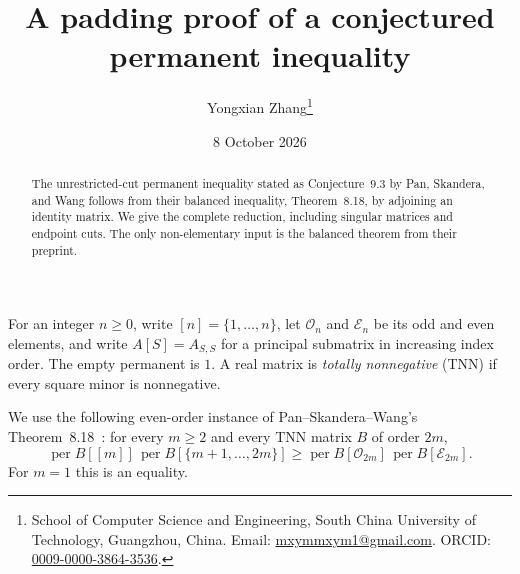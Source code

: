 \documentclass[11pt]{article}
\title{A padding proof of a conjectured permanent inequality}
\author{Yongxian Zhang\thanks{School of Computer Science and Engineering,
South China University of Technology, Guangzhou, China.
Email: \href{mailto:mxymmxym1@gmail.com}{mxymmxym1@gmail.com}.
ORCID: \href{https://orcid.org/0009-0000-3864-3536}{0009-0000-3864-3536}.}}
\date{8 October 2026}
\newcommand{\per}{\operatorname{per}}
\newcommand{\OO}{\mathcal O}
\newcommand{\EE}{\mathcal E}
\begin{document}
\maketitle
\begin{abstract}
The unrestricted-cut permanent inequality stated as Conjecture~9.3 by Pan, Skandera, and Wang follows from their balanced inequality, Theorem~8.18, by adjoining an identity matrix. We give the complete reduction, including singular matrices and endpoint cuts. The only non-elementary input is the balanced theorem from their preprint.
\end{abstract}
For an integer $n\geq 0$, write $[n]=\{1,\dots,n\}$, let $\OO_n$ and $\EE_n$ be its odd and even elements, and write $A[S]=A_{S,S}$ for a principal submatrix in increasing index order. The empty permanent is $1$. A real matrix is \emph{totally nonnegative} (TNN) if every square minor is nonnegative.

We use the following even-order instance of Pan--Skandera--Wang's Theorem~8.18~\cite{PSW}: for every $m\geq2$ and every TNN matrix $B$ of order $2m$,
\begin{equation}\label{balanced}
\per B[[m]]\,\per B[\{m+1,\dots,2m\}]
\geq \per B[\OO_{2m}]\,\per B[\EE_{2m}].
\end{equation}
For $m=1$ this is an equality.
\end{document}
